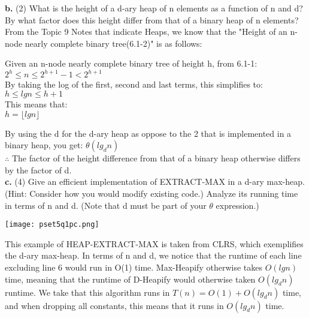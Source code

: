 \documentclass[12pt]{article}
\begin{document}
\linebreak
\textbf{b.} (2) What is the height of a d-ary heap of n elements as a function of n and d? By what factor does this height differ from that of a binary heap of n elements? \\
\linebreak
From the Topic 9 Notes that indicate Heaps, we know that the "Height of an n-node nearly complete binary tree(6.1-2)" is as follows: \\
\begin{center}
Given an n-node nearly complete binary tree of height h, from 6.1-1: \\
$2^h \leqslant n \leqslant 2^{h+1} - 1 < 2^{h+1}$ \\
By taking the log of the first, second and last terms, this simplifies to: \\
$h \leqslant lg n \leqslant h+1$ \\
This means that: \\
$h = \lfloor lg n \rfloor$ \\
\end{center}
By using the d for the d-ary heap as oppose to the 2 that is implemented in a binary heap, you get: 
$\theta(lg_d n)$\\
$\therefore$ The factor of the height difference from that of a binary heap otherwise differs by the factor of d. \\
\linebreak
\textbf{c.} (4) Give an efficient implementation of EXTRACT-MAX in a d-ary max-heap. (Hint: Consider how you would modify existing code.) Analyze its running time in terms of n and d. (Note that d must be part of your $\theta$ expression.) \\
\linebreak
\begin{center}
\texttt{[image: pset5q1pc.png]} \\
\end{center}
\linebreak
This example of HEAP-EXTRACT-MAX is taken from CLRS, which exemplifies the d-ary max-heap. In terms of n and d,  we notice that the runtime of each line excluding line 6 would run in O(1) time. Max-Heapify otherwise takes $O(lg n)$ time, meaning that the runtime of D-Heapify would otherwise taken $O(lg_d n)$ runtime. We take that this algorithm runs in $T(n) = O(1) + O(lg_d n)$ time, and when dropping all constants, this means that it runs in $O(lg_d n)$ time.  \\
\linebreak
\end{document}
